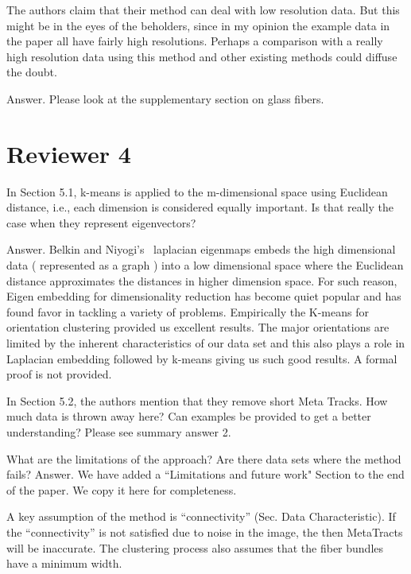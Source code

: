\documentclass[]{article}
\begin{document}
\color{red}
The authors claim that their method can deal with low resolution data.
But this might be in the eyes of the beholders, since in my opinion the example data in the paper all have fairly high resolutions. Perhaps a comparison with a really high resolution data using this method and other existing methods could diffuse the doubt.
\color{black}

Answer.  Please look at the supplementary section on glass fibers.


\section{Reviewer 4}
\color{red}
In Section 5.1, k-means is applied to the m-dimensional space using
Euclidean distance, i.e., each dimension is considered equally important.
Is that really the case when they represent eigenvectors?

\color{black}
Answer. Belkin  and Niyogi's~\cite{Belkin01} laplacian eigenmaps embeds the high dimensional data ( represented as a graph ) into a low dimensional space where the Euclidean distance approximates the distances in higher dimension space. For such reason, Eigen embedding for dimensionality reduction has become quiet popular and has found favor in tackling a variety of problems. Empirically the K-means for orientation clustering provided us excellent results. The major orientations are limited by the inherent characteristics of our data set and this also plays a role in Laplacian embedding followed by k-means giving us such good results. A formal proof is not provided. 

\color{red}
In Section 5.2, the authors mention that they remove short Meta Tracks.
How much data is thrown away here? Can examples be provided to get a
better understanding?
\color{black}
Please see summary answer 2.

\color{red}
What are the limitations of the approach? Are there data sets where the
method fails?
\color{black}
Answer. We have added a ``Limitations and future work" Section to the end of the paper. We copy it here for completeness.


 A key assumption of the method is ``connectivity'' (Sec. Data Characteristic).
 If the ``connectivity'' is not satisfied due to noise in the image, the then MetaTracts will be inaccurate. 
 The clustering process also assumes that the fiber bundles have a minimum width. 


\end{document}
